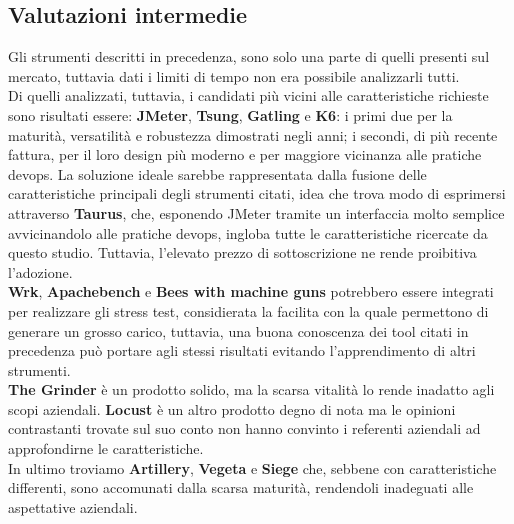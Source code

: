 \subsection{Valutazioni intermedie}
Gli strumenti descritti in precedenza, sono solo una parte di quelli presenti sul mercato, tuttavia dati i limiti di tempo non era possibile analizzarli tutti. \\
Di quelli analizzati, tuttavia, i candidati più vicini alle caratteristiche richieste sono risultati essere: \textbf{JMeter}, \textbf{Tsung}, \textbf{Gatling} e \textbf{K6}: i primi due per la maturità, versatilità e robustezza dimostrati negli anni; i secondi, di più recente fattura, per il loro design più moderno e per maggiore vicinanza alle pratiche \gls{devops}.
La soluzione ideale sarebbe rappresentata dalla fusione delle caratteristiche principali degli strumenti citati, idea che trova modo di esprimersi attraverso \textbf{Taurus}, che, esponendo JMeter tramite un interfaccia molto semplice avvicinandolo alle pratiche \gls{devops}, ingloba tutte le caratteristiche ricercate da questo studio. Tuttavia, l'elevato prezzo di sottoscrizione ne rende proibitiva l'adozione. \\
\textbf{Wrk}, \textbf{Apachebench} e \textbf{Bees with machine guns} potrebbero essere integrati per realizzare gli stress test, considierata la facilita con la quale permettono di generare un grosso carico, tuttavia, una buona conoscenza dei tool citati in precedenza può portare agli stessi risultati evitando l'apprendimento di altri strumenti. \\
\textbf{The Grinder} è un prodotto solido, ma la scarsa vitalità lo rende inadatto agli scopi aziendali.
\textbf{Locust} è un altro prodotto degno di nota ma le opinioni contrastanti trovate sul suo conto non hanno convinto i referenti aziendali ad approfondirne le caratteristiche. \\
In ultimo troviamo \textbf{Artillery}, \textbf{Vegeta} e \textbf{Siege} che, sebbene con caratteristiche differenti, sono accomunati dalla scarsa maturità, rendendoli inadeguati alle aspettative aziendali.
\newpage
